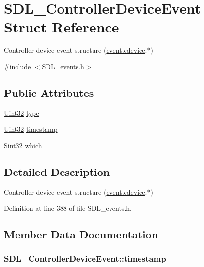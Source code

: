 \hypertarget{struct_s_d_l___controller_device_event}{\section{S\-D\-L\-\_\-\-Controller\-Device\-Event Struct Reference}
\label{struct_s_d_l___controller_device_event}
}


Controller device event structure (\hyperlink{union_s_d_l___event_ad3beed01e690b885728e0b0e1d636378}{event.\-cdevice}.$\ast$)  




{\ttfamily \#include $<$S\-D\-L\-\_\-events.\-h$>$}

\subsection*{Public Attributes}
\begin{DoxyCompactItemize}
\item 
\hyperlink{_s_d_l__stdinc_8h_add440eff171ea5f55cb00c4a9ab8672d}{Uint32} \hyperlink{struct_s_d_l___controller_device_event_a45b3807eaf70a5f5cf712455da277536}{type}
\item 
\hyperlink{_s_d_l__stdinc_8h_add440eff171ea5f55cb00c4a9ab8672d}{Uint32} \hyperlink{struct_s_d_l___controller_device_event_a62945795fc17f5000fddc80e2cf921b8}{timestamp}
\item 
\hyperlink{_s_d_l__stdinc_8h_a7a90b941db9d4582e9ad7abb9940ff7e}{Sint32} \hyperlink{struct_s_d_l___controller_device_event_accb80de1619c1e790cffb6c888c915db}{which}
\end{DoxyCompactItemize}


\subsection{Detailed Description}
Controller device event structure (\hyperlink{union_s_d_l___event_ad3beed01e690b885728e0b0e1d636378}{event.\-cdevice}.$\ast$) 

Definition at line 388 of file S\-D\-L\-\_\-events.\-h.



\subsection{Member Data Documentation}
\hypertarget{struct_s_d_l___controller_device_event_a62945795fc17f5000fddc80e2cf921b8}{
\subsubsection[{timestamp}]{ S\-D\-L\-\_\-\-Controller\-Device\-Event\-::timestamp}}\label{struct_s_d_l___controller_device_event_a62945795fc17f5000fddc80e2cf921b8}


